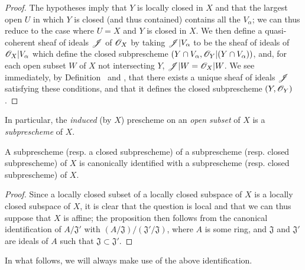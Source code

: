 \begin{proof}
\label{proof-I.4.1.5}
The hypotheses imply that $Y$ is locally closed in $X$ and that the largest open $U$ in which $Y$ is closed (and thus contained) contains all the $V_\alpha$;
we can thus reduce to the case where $U=X$ and $Y$ is closed in $X$.
We then define a quasi-coherent sheaf of ideals $\mathscr{J}$ of $\mathscr{O}_X$ by taking $\mathscr{J}|V_\alpha$ to be the sheaf of ideals of $\mathscr{O}_X|V_\alpha$ which define the closed subprescheme $(Y\cap V_\alpha,\mathscr{O}_Y|(Y\cap V_\alpha))$, and, for each open subset $W$ of $X$ not intersecting $Y$, $\mathscr{J}|W=\mathscr{O}_X|W$.
We see immediately, by Definition~ and , that there exists a unique sheaf of ideals $\mathscr{J}$ satisfying these conditions, and that it defines the closed subprescheme $(Y,\mathscr{O}_Y)$.
\end{proof}

In particular, the \emph{induced} (by $X$) prescheme on an \emph{open subset} of $X$ is a \emph{subprescheme} of $X$.

\begin{proposition}[4.1.6]
\label{I.4.1.6}
A subprescheme (resp. a closed subprescheme) of a subprescheme
(resp. closed subprescheme) of $X$ is canonically identified with a subprescheme (resp. closed subprescheme) of $X$.
\end{proposition}

\begin{proof}
\label{proof-I.4.1.6}
Since a locally closed subset of a locally closed subspace of $X$ is a locally closed subspace of $X$, it is clear  that the question is local and that we can thus suppose that $X$ is affine;
the proposition then follows from the canonical identification of $A/\mathfrak{J}'$ with $(A/\mathfrak{J})/(\mathfrak{J}'/\mathfrak{J})$, where $A$ is some ring, and $\mathfrak{J}$ and $\mathfrak{J}'$ are ideals of $A$ such that $\mathfrak{J}\subset\mathfrak{J}'$.
\end{proof}

In what follows, we will always make use of the above identification.

